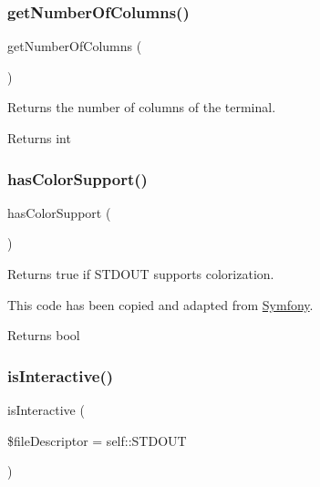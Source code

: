 \subsubsection{\texorpdfstring{get\+Number\+Of\+Columns()}{getNumberOfColumns()}}
{\footnotesize\ttfamily get\+Number\+Of\+Columns (\begin{DoxyParamCaption}{ }\end{DoxyParamCaption})}

Returns the number of columns of the terminal.

\begin{DoxyReturn}{Returns}
int 
\end{DoxyReturn}
\mbox{\label{class_sebastian_bergmann_1_1_environment_1_1_console_a8e041c5c822c549689dd51c5419cfcf3}} 
\subsubsection{\texorpdfstring{has\+Color\+Support()}{hasColorSupport()}}
{\footnotesize\ttfamily has\+Color\+Support (\begin{DoxyParamCaption}{ }\end{DoxyParamCaption})}

Returns true if S\+T\+D\+O\+UT supports colorization.

This code has been copied and adapted from \mbox{\hyperlink{namespace_symfony}{Symfony}}.

\begin{DoxyReturn}{Returns}
bool 
\end{DoxyReturn}
\mbox{\label{class_sebastian_bergmann_1_1_environment_1_1_console_a500b2434d54cb29ec3f01f95b7aa814e}} 
\subsubsection{\texorpdfstring{is\+Interactive()}{isInteractive()}}
{\footnotesize\ttfamily is\+Interactive (\begin{DoxyParamCaption}\item[{}]{\$file\+Descriptor = {\ttfamily self\+:\+:STDOUT} }\end{DoxyParamCaption})}


